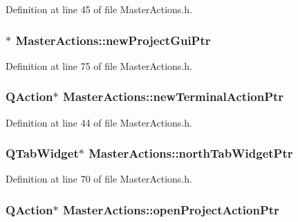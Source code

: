 Definition at line 45 of file Master\-Actions.\-h.

\hypertarget{class_master_actions_a78733336a3d5fd3bbb55eaf0215f0d40}{
\subsubsection[{new\-Project\-Gui\-Ptr}]{$\ast$ Master\-Actions\-::new\-Project\-Gui\-Ptr\hspace{0.3cm}{\ttfamily [private]}}}\label{class_master_actions_a78733336a3d5fd3bbb55eaf0215f0d40}


Definition at line 75 of file Master\-Actions.\-h.

\hypertarget{class_master_actions_a6c3b1d9319fbf23f5a7cbe8305e16fc1}{
\subsubsection[{new\-Terminal\-Action\-Ptr}]{\setlength{\rightskip}{0pt plus 5cm}Q\-Action$\ast$ Master\-Actions\-::new\-Terminal\-Action\-Ptr\hspace{0.3cm}{\ttfamily [private]}}}\label{class_master_actions_a6c3b1d9319fbf23f5a7cbe8305e16fc1}


Definition at line 44 of file Master\-Actions.\-h.

\hypertarget{class_master_actions_a4fbb50c5700fd6b66ace4cff6d3bde3e}{
\subsubsection[{north\-Tab\-Widget\-Ptr}]{\setlength{\rightskip}{0pt plus 5cm}Q\-Tab\-Widget$\ast$ Master\-Actions\-::north\-Tab\-Widget\-Ptr\hspace{0.3cm}{\ttfamily [private]}}}\label{class_master_actions_a4fbb50c5700fd6b66ace4cff6d3bde3e}


Definition at line 70 of file Master\-Actions.\-h.

\hypertarget{class_master_actions_a3b4d98cdbfaa8e287d420513a8df53ee}{
\subsubsection[{open\-Project\-Action\-Ptr}]{\setlength{\rightskip}{0pt plus 5cm}Q\-Action$\ast$ Master\-Actions\-::open\-Project\-Action\-Ptr\hspace{0.3cm}{\ttfamily [private]}}}\label{class_master_actions_a3b4d98cdbfaa8e287d420513a8df53ee}


